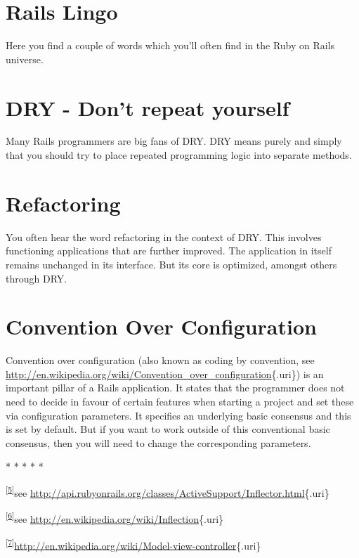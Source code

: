 \documentclass[a4paper]{book}
\begin{document}
\section{Rails Lingo}\label{rails-lingo}

Here you find a couple of words which you'll often find in the Ruby on Rails universe.

\section{DRY - Don't repeat yourself}\label{dry---dont-repeat-yourself}

Many Rails programmers are big fans of DRY. DRY means purely and simply that you should try to place repeated programming logic into separate methods.

\section{Refactoring}\label{refactoring}

You often hear the word refactoring in the context of DRY. This involves functioning applications that are further improved. The application in itself remains unchanged in its interface. But its core is optimized, amongst others through DRY.

\section{Convention Over Configuration}\label{convention-over-configuration}

Convention over configuration (also known as coding by convention, see \url{http://en.wikipedia.org/wiki/Convention_over_configuration}\{.uri\}) is an important pillar of a Rails application. It states that the programmer does not need to decide in favour of certain features when starting a project and set these via configuration parameters. It specifies an underlying basic consensus and this is set by default. But if you want to work outside of this conventional basic consensus, then you will need to change the corresponding parameters.

* * * * *

\textsuperscript{{[}\hyperref[idp1626704]{5}{]}}see \url{http://api.rubyonrails.org/classes/ActiveSupport/Inflector.html}\{.uri\}

\textsuperscript{{[}\hyperref[idp1628816]{6}{]}}see \url{http://en.wikipedia.org/wiki/Inflection}\{.uri\}

\textsuperscript{{[}\hyperref[idp1456352]{7}{]}}\url{http://en.wikipedia.org/wiki/Model-view-controller}\{.uri\}
\end{document}
